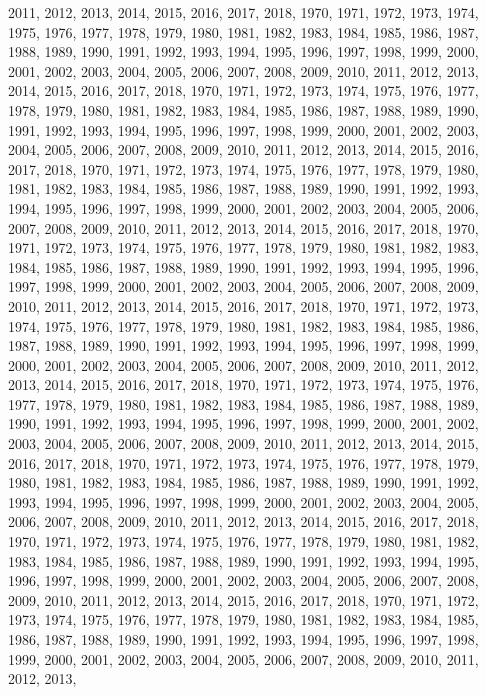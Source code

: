 \documentclass[
]{article}
\begin{document}
2011, 2012, 2013, 2014, 2015, 2016, 2017, 2018, 1970, 1971, 1972, 1973,
1974, 1975, 1976, 1977, 1978, 1979, 1980, 1981, 1982, 1983, 1984, 1985,
1986, 1987, 1988, 1989, 1990, 1991, 1992, 1993, 1994, 1995, 1996, 1997,
1998, 1999, 2000, 2001, 2002, 2003, 2004, 2005, 2006, 2007, 2008, 2009,
2010, 2011, 2012, 2013, 2014, 2015, 2016, 2017, 2018, 1970, 1971, 1972,
1973, 1974, 1975, 1976, 1977, 1978, 1979, 1980, 1981, 1982, 1983, 1984,
1985, 1986, 1987, 1988, 1989, 1990, 1991, 1992, 1993, 1994, 1995, 1996,
1997, 1998, 1999, 2000, 2001, 2002, 2003, 2004, 2005, 2006, 2007, 2008,
2009, 2010, 2011, 2012, 2013, 2014, 2015, 2016, 2017, 2018, 1970, 1971,
1972, 1973, 1974, 1975, 1976, 1977, 1978, 1979, 1980, 1981, 1982, 1983,
1984, 1985, 1986, 1987, 1988, 1989, 1990, 1991, 1992, 1993, 1994, 1995,
1996, 1997, 1998, 1999, 2000, 2001, 2002, 2003, 2004, 2005, 2006, 2007,
2008, 2009, 2010, 2011, 2012, 2013, 2014, 2015, 2016, 2017, 2018, 1970,
1971, 1972, 1973, 1974, 1975, 1976, 1977, 1978, 1979, 1980, 1981, 1982,
1983, 1984, 1985, 1986, 1987, 1988, 1989, 1990, 1991, 1992, 1993, 1994,
1995, 1996, 1997, 1998, 1999, 2000, 2001, 2002, 2003, 2004, 2005, 2006,
2007, 2008, 2009, 2010, 2011, 2012, 2013, 2014, 2015, 2016, 2017, 2018,
1970, 1971, 1972, 1973, 1974, 1975, 1976, 1977, 1978, 1979, 1980, 1981,
1982, 1983, 1984, 1985, 1986, 1987, 1988, 1989, 1990, 1991, 1992, 1993,
1994, 1995, 1996, 1997, 1998, 1999, 2000, 2001, 2002, 2003, 2004, 2005,
2006, 2007, 2008, 2009, 2010, 2011, 2012, 2013, 2014, 2015, 2016, 2017,
2018, 1970, 1971, 1972, 1973, 1974, 1975, 1976, 1977, 1978, 1979, 1980,
1981, 1982, 1983, 1984, 1985, 1986, 1987, 1988, 1989, 1990, 1991, 1992,
1993, 1994, 1995, 1996, 1997, 1998, 1999, 2000, 2001, 2002, 2003, 2004,
2005, 2006, 2007, 2008, 2009, 2010, 2011, 2012, 2013, 2014, 2015, 2016,
2017, 2018, 1970, 1971, 1972, 1973, 1974, 1975, 1976, 1977, 1978, 1979,
1980, 1981, 1982, 1983, 1984, 1985, 1986, 1987, 1988, 1989, 1990, 1991,
1992, 1993, 1994, 1995, 1996, 1997, 1998, 1999, 2000, 2001, 2002, 2003,
2004, 2005, 2006, 2007, 2008, 2009, 2010, 2011, 2012, 2013, 2014, 2015,
2016, 2017, 2018, 1970, 1971, 1972, 1973, 1974, 1975, 1976, 1977, 1978,
1979, 1980, 1981, 1982, 1983, 1984, 1985, 1986, 1987, 1988, 1989, 1990,
1991, 1992, 1993, 1994, 1995, 1996, 1997, 1998, 1999, 2000, 2001, 2002,
2003, 2004, 2005, 2006, 2007, 2008, 2009, 2010, 2011, 2012, 2013, 2014,
2015, 2016, 2017, 2018, 1970, 1971, 1972, 1973, 1974, 1975, 1976, 1977,
1978, 1979, 1980, 1981, 1982, 1983, 1984, 1985, 1986, 1987, 1988, 1989,
1990, 1991, 1992, 1993, 1994, 1995, 1996, 1997, 1998, 1999, 2000, 2001,
2002, 2003, 2004, 2005, 2006, 2007, 2008, 2009, 2010, 2011, 2012, 2013,
\end{document}
